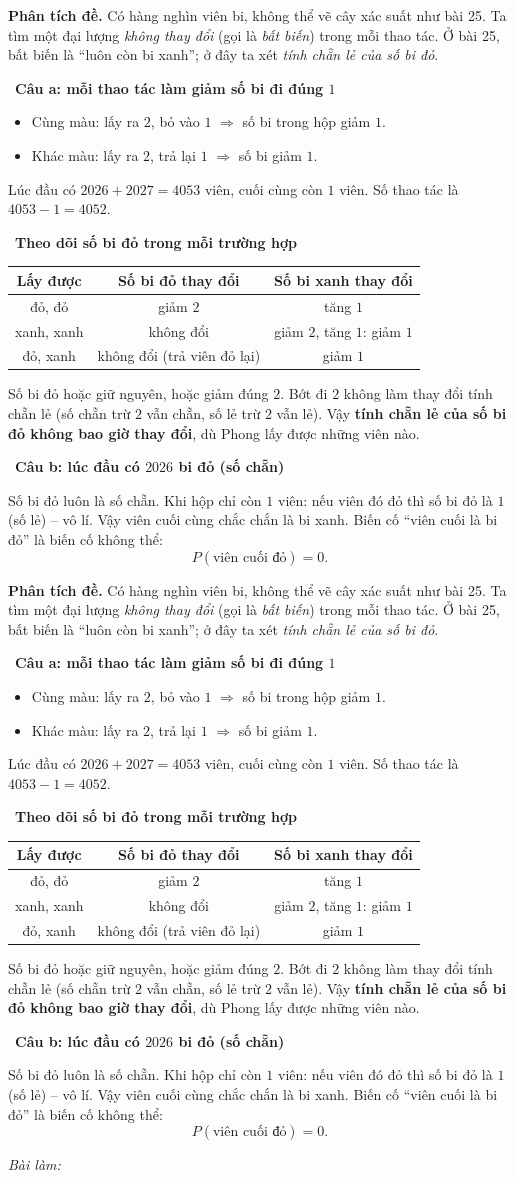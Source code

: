 \documentclass[11pt]{article}
\newif\ifsol \soltrue
\newcommand{\probsol}[1]{%
  \begin{lrbox}{\solmeasure}\begin{minipage}{\dimexpr\linewidth-24pt\relax}#1\end{minipage}\end{lrbox}%
  \ifsol
    \begin{solbox}#1\end{solbox}%
  \else
    \setlength{\solht}{\dimexpr\ht\solmeasure+\dp\solmeasure+0.85cm\relax}%
    \ifdim\solht<1.35cm\setlength{\solht}{1.35cm}\fi
    \ifdim\solht>\StudentMaxWork\setlength{\solht}{\StudentMaxWork}\fi
    \begin{tcolorbox}[colback=white,colframe=Line,boxrule=0.8pt,arc=5pt,
      left=8pt,right=8pt,top=4pt,bottom=4pt,height=\solht]{\footnotesize\color{Slate}\itshape\WorkWord}\end{tcolorbox}%
  \fi}
\newlength{\StudentMaxWork}\setlength{\StudentMaxWork}{7.5cm}
\newcommand{\step}[2]{\par\smallskip\noindent{\bfseries\color{tmBlue!85!black}\StepWord~#1.}\ {\bfseries #2}\par\nopagebreak}
\def\WorkWord{Bài làm:}
\def\StepWord{Bước}
\begin{document}
\probsol{
\textbf{Phân tích đề.} Có hàng nghìn viên bi, không thể vẽ cây xác suất như bài 25. Ta tìm một đại lượng \emph{không thay đổi} (gọi là
\emph{bất biến}) trong mỗi thao tác. Ở bài 25, bất biến là ``luôn còn bi xanh''; ở đây ta xét \emph{tính chẵn lẻ của số bi đỏ}.

\step{1}{Câu a: mỗi thao tác làm giảm số bi đi đúng $1$}
\begin{itemize}[leftmargin=1.2em,itemsep=1pt,topsep=2pt]
\item Cùng màu: lấy ra $2$, bỏ vào $1$ $\Rightarrow$ số bi trong hộp giảm $1$.
\item Khác màu: lấy ra $2$, trả lại $1$ $\Rightarrow$ số bi giảm $1$.
\end{itemize}
Lúc đầu có $2026+2027=4053$ viên, cuối cùng còn $1$ viên. Số thao tác là $4053-1=4052$.

\step{2}{Theo dõi số bi đỏ trong mỗi trường hợp}
\begin{center}\begin{tabular}{|c|c|c|}\hline
Lấy được & Số bi đỏ thay đổi & Số bi xanh thay đổi\\\hline
đỏ, đỏ & giảm $2$ & tăng $1$\\\hline
xanh, xanh & không đổi & giảm $2$, tăng $1$: giảm $1$\\\hline
đỏ, xanh & không đổi (trả viên đỏ lại) & giảm $1$\\\hline
\end{tabular}\end{center}
\begin{proofbox}Số bi đỏ hoặc giữ nguyên, hoặc giảm đúng $2$. Bớt đi $2$ không làm thay đổi tính chẵn lẻ (số chẵn trừ $2$ vẫn chẵn,
số lẻ trừ $2$ vẫn lẻ). Vậy \textbf{tính chẵn lẻ của số bi đỏ không bao giờ thay đổi}, dù Phong lấy được những viên nào.\end{proofbox}

\step{3}{Câu b: lúc đầu có $2026$ bi đỏ (số chẵn)}
Số bi đỏ luôn là số chẵn. Khi hộp chỉ còn $1$ viên: nếu viên đó đỏ thì số bi đỏ là $1$ (số lẻ) -- vô lí. Vậy viên cuối cùng chắc chắn
là bi xanh. Biến cố ``viên cuối là bi đỏ'' là biến cố không thể:
\[P(\text{viên cuối đỏ})=0.\]

}
\end{document}
